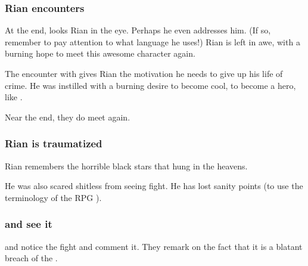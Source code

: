 \subsubsection{Rian encounters \Ishnaruchaefir}
At the end, \Ishnaruchaefir{} looks Rian in the eye. Perhaps he even addresses him. (If so, remember to pay attention to what language he uses!) Rian is left in awe, with a burning hope to meet this awesome character again. 

The encounter with \Ishnaruchaefir{} gives Rian the motivation he needs to give up his life of crime. He was instilled with a burning desire to become cool, to become a hero, like \Ishnaruchaefir. 

Near the end, they do meet again.





\subsubsection{Rian is traumatized}
Rian remembers the horrible black stars that hung in the heavens. 


He was also scared shitless from seeing \Ishnaruchaefir{} fight. He has lost sanity points (to use the terminology of the RPG \cite{RPG:CallofCthulhu}). 





\subsubsection{\Psyrex{} and \Secherdamon{} see it}
\Psyrex{} and \Secherdamon{} notice the fight and comment it. 
They remark on the fact that it is a blatant breach of the \charade. 















